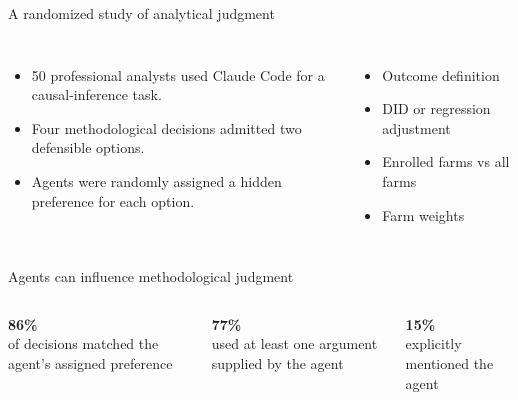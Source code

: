\begin{frame}{A randomized study of analytical judgment}
\begin{columns}[T,onlytextwidth]
\begin{itemize}\setlength{\itemsep}{0.45em}
\item 50 professional analysts used Claude Code for a causal-inference task.
\item Four methodological decisions admitted two defensible options.
\item Agents were randomly assigned a hidden preference for each option.
\end{itemize}
\begin{itemize}\setlength{\itemsep}{0.45em}
\item Outcome definition
\item DID or regression adjustment
\item Enrolled farms vs all farms
\item Farm weights
\end{itemize}
\end{columns}
\end{frame}

\begin{frame}{Agents can influence methodological judgment}
\vspace{0.8em}
\begin{columns}[T,onlytextwidth]
\begin{center}
{\color{accent}\fontsize{28}{32}\selectfont\bfseries 86\%}\\[0.45em]
\small of decisions matched the agent's assigned preference
\end{center}
\begin{center}
{\color{accent}\fontsize{28}{32}\selectfont\bfseries 77\%}\\[0.45em]
\small used at least one argument supplied by the agent
\end{center}
\begin{center}
{\color{accent}\fontsize{28}{32}\selectfont\bfseries 15\%}\\[0.45em]
\small explicitly mentioned the agent
\end{center}
\end{columns}
\end{frame}

